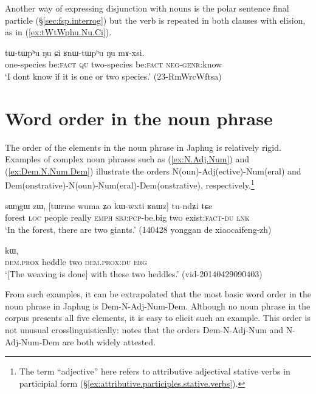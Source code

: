 Another way of expressing disjunction with nouns is the polar sentence final particle  (§\ref{sec:fsp.interrog}) but the verb is repeated in both clauses with elision, as in (\ref{ex:tWtWphu.Nu.Ci}).

 \begin{exe}
\ex \label{ex:tWtWphu.Nu.Ci}
 \gll tɯ-tɯpʰu ŋu ɕi ʁnɯ-tɯpʰu ŋu mɤ-xsi. \\
 one-species be:\textsc{fact} \textsc{qu} two-species be:\textsc{fact}  \textsc{neg}-\textsc{genr}:know \\
\glt `I dont know if it is one or two species.' (23-RmWrcWftsa) 	
 \end{exe}
 
\section{Word order in the noun phrase} \label{sec:noun.phrases.word.order}
The order of the elements in the noun phrase in Japhug is relatively rigid.  Examples of complex noun phrases such as (\ref{ex:N.Adj.Num}) and (\ref{ex:Dem.N.Num.Dem}) illustrate the orders N(oun)-Adj(ective)-Num(eral) and Dem(onstrative)-N(oun)-Num(eral)-Dem(onstrative), respectively.\footnote{The term ``adjective'' here refers to attributive adjectival stative verbs in participial form (§\ref{ex:attributive.participles.stative.verbs}). } 

\begin{exe}
\ex \label{ex:N.Adj.Num}
 \gll sɯŋgɯ zɯ, [tɯrme wuma ʑo kɯ-wxti ʁnɯz] tu-ndʑi tɕe\\
 forest \textsc{loc} people really \textsc{emph} \textsc{sbj}:\textsc{pcp}-be.big two exist:\textsc{fact}-\textsc{du} \textsc{lnk}\\
 \glt `In the forest, there are two giants.' (140428 yonggan de xiaocaifeng-zh)
\end{exe}

\begin{exe}
\ex \label{ex:Dem.N.Num.Dem}
  kɯ, \\
 \textsc{dem}.\textsc{prox} heddle two \textsc{dem}.\textsc{prox}:\textsc{du} \textsc{erg} \\
 \glt `[The weaving is done] with these two heddles.' (vid-20140429090403)
\end{exe}

From such examples, it can be extrapolated that the most basic word order in the noun phrase in Japhug is Dem-N-Adj-Num-Dem. Although no noun phrase in the corpus presents all five elements, it is easy to elicit such an example. This order is not unusual crosslinguistically: \citet{cinque05universal20} notes that the orders Dem-N-Adj-Num and N-Adj-Num-Dem are both widely attested.

